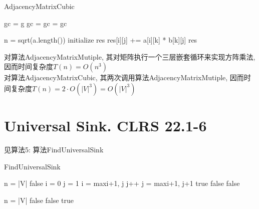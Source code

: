 \documentclass{article}
\begin{document}
\begin{algorithm}
\caption{AdjacencyMatrixCubic}
\begin{algorithmic}[1]
\State gc = g
\State gc = 
\State gc =  
\State \Return gc
\EndProcedure

\State n = sqrt(a.length()) 
\State initialize res 
\State res[i][j] += a[i][k] * b[k][j]
\EndFor
\EndFor
\EndFor
\Return res
\EndProcedure
\end{algorithmic}
\end{algorithm}

对算法AdjacencyMatrixMutiple, 其对矩阵执行一个三层嵌套循环来实现方阵乘法, 因而时间复杂度$T(n) = O(n^3)$ \\
对算法AdjacencyMatrixCubic, 其两次调用算法AdjacencyMatrixMutiple, 因而时间复杂度$T(n) = 2 \cdot O(|V|^3) = O(|V|^3)$


\section{Universal Sink. CLRS 22.1-6}
见算法5: 算法FindUniversalSink

\begin{algorithm}
\caption{FindUniversalSink}
\begin{algorithmic}[1]
\State n = |V|
\State \Return false
\EndIf
\EndFor
\State i = 0
\State j = 1
\State i = max{i+1, j}
\State j++
\Else
\State j = max{i+1, j+1}
\EndIf
{}
\State \Return true
\Else
\State \Return false
\EndIf
\Else
\State \Return false
\EndIf
\EndWhile
\EndProcedure

\State n = |V|
\State \Return false
\EndIf
{}
\State \Return false
\EndIf
\EndIf
\EndFor
\State \Return true
\EndProcedure
\end{algorithmic}
\end{algorithm}
\end{document}
